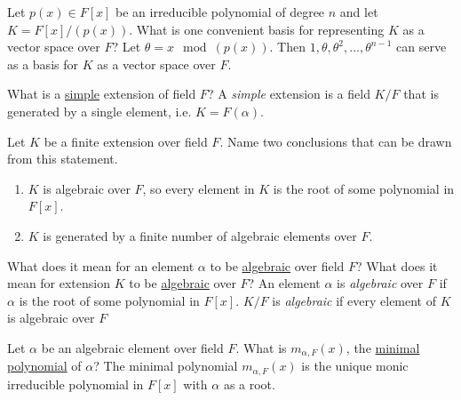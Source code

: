\documentclass[avery5371,grid]{flashcards}
\begin{document}
\begin{flashcard}[Fields]{Let $p(x) \in F[x]$ be an irreducible polynomial of degree $n$ and let $K = F[x]/(p(x))$. What is one convenient basis for representing $K$ as a vector space over $F$?}
 Let $\theta = x \mod (p(x))$. Then $1, \theta, \theta^2, \ldots, \theta^{n-1}$ can serve as a basis for $K$ as a vector space over $F$.
\end{flashcard}

\begin{flashcard}[Fields]{What is a \underline{simple} extension of field $F$?}
 A \emph{simple} extension is a field $K/F$ that is generated by a single element, i.e. $K = F(\alpha)$.
\end{flashcard}

\begin{flashcard}[Fields]{Let $K$ be a finite extension over field $F$. Name two conclusions that can be drawn from this statement.}
 \begin{enumerate}
      \item $K$ is algebraic over $F$, so every element in $K$ is the root of some polynomial in $F[x]$.
      \item $K$ is generated by a finite number of algebraic elements over $F$.
 \end{enumerate}
\end{flashcard}

\begin{flashcard}[Fields]{What does it mean for an element $\alpha$ to be \underline{algebraic} over field $F$? What does it mean for extension $K$ to be \underline{algebraic} over $F$?}
 An element $\alpha$ is \emph{algebraic} over $F$ if $\alpha$ is the root of some polynomial in $F[x]$. $K/F$ is \emph{algebraic} if every element of $K$ is algebraic over $F$
\end{flashcard}

\begin{flashcard}[Fields]{Let $\alpha$ be an algebraic element over field $F$. What is $m_{\alpha,F}(x)$, the \underline{minimal polynomial} of $\alpha$?}
 The minimal polynomial $m_{\alpha,F}(x)$ is the unique monic irreducible polynomial in $F[x]$ with $\alpha$ as a root.
\end{flashcard}
\end{document}
